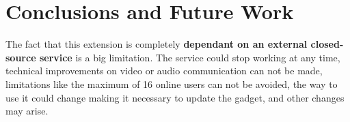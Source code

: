 \section{Conclusions and Future Work}
The fact that this extension is completely \textbf{dependant on an external closed-source service} is a big limitation. The service could stop working at any time, technical improvements on video or audio communication can not be made, limitations like the maximum of 16 online users can not be avoided, the way to use it could change making it necessary to update the gadget, and other changes may arise.
\newpage

